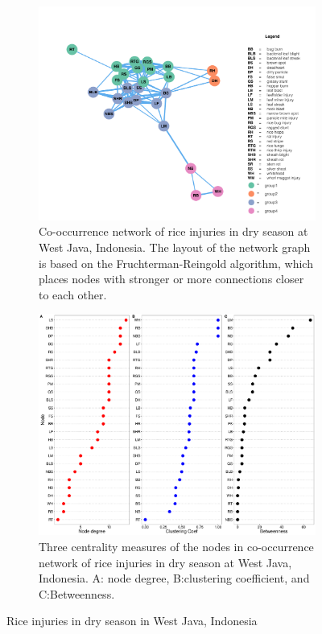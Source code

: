\begin{figure}
    \centering
    \begin{subfigure}[b]{1\textwidth}
        \includegraphics[width = 1\textwidth]{figures/networkWJ_ds/networkWJ_ds.pdf}
        \caption{Co-occurrence network of rice injuries in dry season at West Java, Indonesia. The layout of the network graph is based on the Fruchterman-Reingold algorithm, which places nodes with stronger or more connections closer to each other.}
        \label{fig:networkWJ_ds}
    \end{subfigure}
    \begin{subfigure}[b]{1\textwidth}
        \includegraphics[width = 1\textwidth]{figures/nodepropWJ_ds/nodepropWJ_ds.pdf}
        \caption{Three centrality measures of the nodes in co-occurrence network of rice injuries in dry season at West Java, Indonesia. A: node degree, B:clustering coefficient, and C:Betweenness.}
        \label{fig:nodepropWJ_ds}
    \end{subfigure}
    \caption{Rice injuries in dry season in West Java, Indonesia}
    \label{fig:WJ_ds}
\end{figure}

